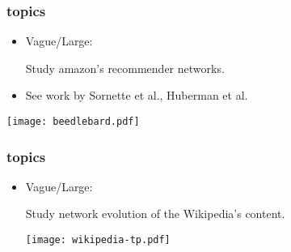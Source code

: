 


\begin{frame}
  \frametitle{topics}

  \begin{itemize}
  \item
    Vague/Large:

    Study amazon's recommender
    networks.
  \item
    See work by Sornette et al., Huberman et al.
  \end{itemize}

  \texttt{[image: beedlebard.pdf]}

\end{frame}


\begin{frame}
  \frametitle{topics}

  \begin{itemize}
  \item
    Vague/Large:

    Study network evolution 
    of the Wikipedia's
    content.

    \bigskip
    \texttt{[image: wikipedia-tp.pdf]}
  \end{itemize}

\end{frame}

